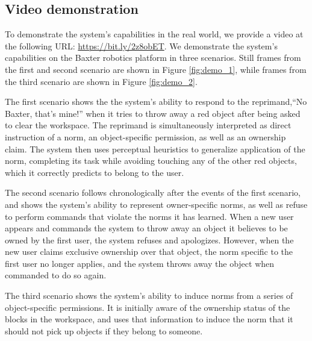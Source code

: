 \documentclass[letterpaper]{article} %
\begin{document}
\subsection{Video demonstration}

To demonstrate the system's capabilities in the real world, we provide a video at the following URL: \url{https://bit.ly/2z8obET}. We demonstrate the system's capabilities on the Baxter robotics platform in three scenarios. Still frames from the first and second scenario are shown in Figure \ref{fig:demo_1}, while frames from the third scenario are shown in Figure \ref{fig:demo_2}.

The first scenario shows the the system's ability to respond to the reprimand,``No Baxter, that's mine!'' when it tries to throw away a red object after being asked to clear the workspace. The reprimand is simultaneously interpreted as direct instruction of a norm, an object-specific permission, as well as an ownership claim. The system then uses perceptual heuristics to generalize application of the norm, completing its task while avoiding touching any of the other red objects, which it correctly predicts to belong to the user.

The second scenario follows chronologically after the events of the first scenario, and shows the system's ability to represent owner-specific norms, as well as refuse to perform commands that violate the norms it has learned. When a new user appears and commands the system to throw away an object it believes to be owned by the first user, the system refuses and apologizes. However, when the new user claims exclusive ownership over that object, the norm specific to the first user no longer applies, and the system throws away the object when commanded to do so again.

The third scenario shows the system's ability to induce norms from a series of object-specific permissions. It is initially aware of the ownership status of the blocks in the workspace, and uses that information to induce the norm that it should not pick up objects if they belong to someone.
\end{document}
